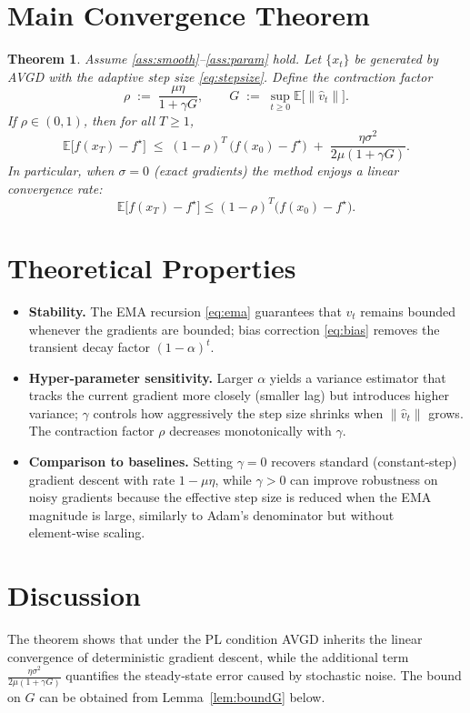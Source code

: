 \documentclass{article}
\newtheorem{theorem}{Theorem}
\newcommand{\E}{\mathbb{E}}
\begin{document}
\section*{Main Convergence Theorem}
\begin{theorem}\label{thm:linear}
Assume \ref{ass:smooth}–\ref{ass:param} hold. Let $\{x_{t}\}$ be generated by AVGD with the adaptive step size \eqref{eq:stepsize}. Define the contraction factor
\[
    \rho \;:=\; \frac{\mu\eta}{1+\gamma G},\qquad 
    G\;:=\;\sup_{t\ge0}\E\!\bigl[\|\widehat v_{t}\|\bigr].
\]
If $\rho\in(0,1)$, then for all $T\ge1$,
\[
    \E\!\bigl[f(x_{T})-f^{\star}\bigr]\;\le\;(1-\rho)^{T}\,\bigl(f(x_{0})-f^{\star}\bigr)
    \;+\; \frac{\eta\sigma^{2}}{2\mu(1+\gamma G)} .
\]
In particular, when $\sigma=0$ (exact gradients) the method enjoys a \emph{linear} convergence rate:
\[
    \E\!\bigl[f(x_{T})-f^{\star}\bigr]\le (1-\rho)^{T}\bigl(f(x_{0})-f^{\star}\bigr).
\]
\end{theorem}

\section*{Theoretical Properties}
\begin{itemize}[leftmargin=*]
    \item \textbf{Stability.} The EMA recursion \eqref{eq:ema} guarantees that $v_{t}$ remains bounded whenever the gradients are bounded; bias correction \eqref{eq:bias} removes the transient decay factor $(1-\alpha)^{t}$.
    \item \textbf{Hyper‑parameter sensitivity.} Larger $\alpha$ yields a variance estimator that tracks the current gradient more closely (smaller lag) but introduces higher variance; $\gamma$ controls how aggressively the step size shrinks when $\|\widehat v_{t}\|$ grows. The contraction factor $\rho$ decreases monotonically with $\gamma$.
    \item \textbf{Comparison to baselines.} Setting $\gamma=0$ recovers standard (constant‑step) gradient descent with rate $1-\mu\eta$, while $\gamma>0$ can improve robustness on noisy gradients because the effective step size is reduced when the EMA magnitude is large, similarly to Adam’s denominator but without element‑wise scaling.
\end{itemize}

\section*{Discussion}
The theorem shows that under the PL condition AVGD inherits the linear convergence of deterministic gradient descent, while the additional term $\frac{\eta\sigma^{2}}{2\mu(1+\gamma G)}$ quantifies the steady‑state error caused by stochastic noise. The bound on $G$ can be obtained from Lemma~\ref{lem:boundG} below.
\end{document}
